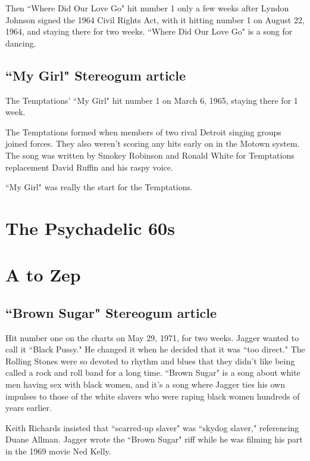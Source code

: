\documentclass[12pt, a4paper, twoside, openright, titlepage]{book}
\begin{document}
Then ``Where Did Our Love Go" hit number 1 only a few weeks after Lyndon Johnson signed the 1964 Civil Rights Act, with it hitting number 1 on August 22, 1964, and staying there for two weeks. ``Where Did Our Love Go" is a song for dancing. 


\section{``My Girl" Stereogum article}

The Temptations' ``My Girl" hit number 1 on March 6, 1965, staying there for 1 week.


The Temptations formed when members of two rival Detroit singing groups joined forces. They also weren't scoring any hits early on in the Motown system. The song was written by Smokey Robinson and Ronald White for Temptations replacement David Ruffin and his raspy voice. 

``My Girl" was really the start for the Temptations.




\chapter{The Psychadelic 60s}



\chapter{A to Zep}




\section{``Brown Sugar" Stereogum article}

Hit number one on the charts on May 29, 1971, for two weeks. Jagger wanted to call it ``Black Pussy." He changed it when he decided that it was ``too direct." The Rolling Stones were so devoted to rhythm and blues that they didn't like being called a rock and roll band for a long time. ``Brown Sugar" is a song about white men having sex with black women, and it's a song where Jagger ties his own impulses to those of the white slavers who were raping black women hundreds of years earlier. 

Keith Richards insisted that ``scarred-up slaver" was ``skydog slaver," referencing Duane Allman. Jagger wrote the ``Brown Sugar" riff while he was filming his part in the 1969 movie Ned Kelly. 
\end{document}
